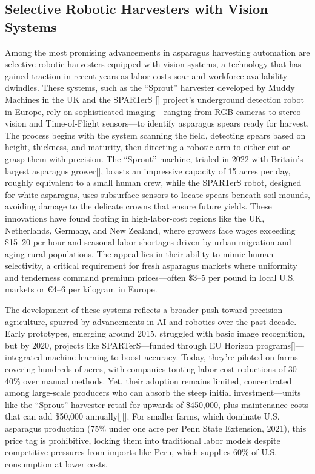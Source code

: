 \subsection{Selective Robotic Harvesters with Vision Systems}
Among the most promising advancements in asparagus harvesting automation are selective robotic harvesters equipped with vision systems, a technology that has gained traction in recent years as labor costs soar and workforce availability dwindles. These systems, such as the ``Sprout'' harvester developed by Muddy Machines in the UK and the SPARTerS [\cite{cordis2025}] project’s underground detection robot in Europe, rely on sophisticated imaging—ranging from RGB cameras to stereo vision and Time-of-Flight sensors—to identify asparagus spears ready for harvest. The process begins with the system scanning the field, detecting spears based on height, thickness, and maturity, then directing a robotic arm to either cut or grasp them with precision. The ``Sprout'' machine, trialed in 2022 with Britain’s largest asparagus grower[\cite{muddymachines2025}], boasts an impressive capacity of 15 acres per day, roughly equivalent to a small human crew, while the SPARTerS robot, designed for white asparagus, uses subsurface sensors to locate spears beneath soil mounds, avoiding damage to the delicate crowns that ensure future yields. These innovations have found footing in high-labor-cost regions like the UK, Netherlands, Germany, and New Zealand, where growers face wages exceeding \$15--20 per hour and seasonal labor shortages driven by urban migration and aging rural populations. The appeal lies in their ability to mimic human selectivity, a critical requirement for fresh asparagus markets where uniformity and tenderness command premium prices—often \$3--5 per pound in local U.S. markets or €4--6 per kilogram in Europe.

The development of these systems reflects a broader push toward precision agriculture, spurred by advancements in AI and robotics over the past decade. Early prototypes, emerging around 2015, struggled with basic image recognition, but by 2020, projects like SPARTerS—funded through EU Horizon programs[\cite{pnoconsultants_horizon}]—integrated machine learning to boost accuracy. Today, they’re piloted on farms covering hundreds of acres, with companies touting labor cost reductions of 30--40\% over manual methods. Yet, their adoption remains limited, concentrated among large-scale producers who can absorb the steep initial investment—units like the ``Sprout'' harvester retail for upwards of \$450,000, plus maintenance costs that can add \$50,000 annually[\cite{muddymachines2025}][\cite{muddymachines2025}]. For smaller farms, which dominate U.S. asparagus production (75\% under one acre per Penn State Extension, 2021), this price tag is prohibitive, locking them into traditional labor models despite competitive pressures from imports like Peru, which supplies 60\% of U.S. consumption at lower costs.

